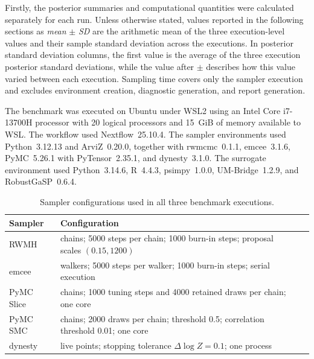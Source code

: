Firstly, the posterior summaries and computational quantities were calculated separately for each run. Unless otherwise stated, values reported in the following sections as \textsl{mean} $\pm$ \textsl{SD} are the arithmetic mean of the three execution-level values and their sample standard deviation across the executions. In posterior standard deviation columns, the first value is the average of the three execution posterior standard deviations, while the value after $\pm$ describes how this value varied between each execution. Sampling time covers only the sampler execution and excludes environment creation, diagnostic generation, and report generation.

The benchmark was executed on Ubuntu under WSL2 using an Intel Core i7-13700H processor with 20 logical processors and 15~GiB of memory available to WSL. The workflow used Nextflow~25.10.4. The sampler environments used Python~3.12.13 and ArviZ~0.20.0, together with rwmcmc~0.1.1, emcee~3.1.6, PyMC~5.26.1 with PyTensor~2.35.1, and dynesty~3.1.0. The surrogate environment used Python~3.14.6, R~4.4.3, psimpy~1.0.0, UM-Bridge~1.2.9, and RobustGaSP~0.6.4.

\begin{table}[htbp]
\centering
\caption{Sampler configurations used in all three benchmark executions.}
\label{tab:benchmark-configurations}
\begin{tabular}{@{}
  >{\raggedright\arraybackslash}p{}
  >{\raggedright\arraybackslash}p{}
  r@{}}
\toprule
Sampler & Configuration \\
\midrule
RWMH
  & 4 chains; 5000 steps per chain; 1000 burn-in steps; proposal scales $(0.15,1200)$ \\

emcee
  & 8 walkers; 5000 steps per walker; 1000 burn-in steps; serial execution \\

PyMC Slice
  & 4 chains; 1000 tuning steps and 4000 retained draws per chain; one core \\

PyMC SMC
  & 4 chains; 2000 draws per chain; threshold 0.5; correlation threshold 0.01; one core \\

dynesty
  & 3000 live points; stopping tolerance $\Delta\log Z=0.1$; one process \\
\bottomrule
\end{tabular}
\end{table}



